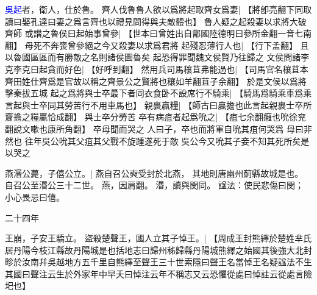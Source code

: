 \textcolor{blue}{吳起}者，衛人，仕於魯。
齊人伐魯魯人欲以爲將起取齊女爲妻|{
	【將卽亮翻下同取讀曰娶孔達曰妻之爲言齊也以禮見問得與夫敵體也】
	}
魯人疑之起殺妻以求將大破齊師
或譛之魯侯曰起始事曾參|{
	【世本曰曾姓出自鄫國陸德明曰參所金翻一音七南翻】
	}
母死不奔喪曾參絕之今又殺妻以求爲君將
起殘忍薄行人也|{
	【行下孟翻】
	}
且以魯國區區而有勝敵之名則諸侯圖魯矣
起恐得罪聞魏文侯賢乃往歸之
文侯問諸李克李克曰起貪而好色|{
	【好呼到翻】}
然用兵司馬穰苴弗能過也|{
	【司馬官名穰苴本齊田姓仕齊爲是官故以稱之齊景公之賢將也穰如羊翻苴子余翻】
	}
於是文侯以爲將擊秦拔五城
起之爲將與士卒最下者同衣食卧不設席行不騎乘|{
	【騎馬爲騎乘車爲乘言起與士卒同其勞苦行不用車馬也】}
親裹贏糧|{
	【師古曰贏擔也此言起親裹士卒所齎擔之糧贏恰成翻】}
與士卒分勞苦
卒有病疽者起爲吮之|{
	【疽七余翻癰也吮徐兖翻說文嗽也康所角翻】}
卒母聞而哭之
人曰子，卒也而將軍自吮其疽何哭爲
母曰非然也
往年吳公吮其父疽其父戰不旋踵遂死于敵
吳公今又吮其子妾不知其死所矣是以哭之

燕湣公薨，子僖公立。|{
	燕自召公奭受封於北燕，
	其地則唐幽州薊縣故城是也。
	自召公至湣公三十二世。
	燕，因肩翻。
	湣，讀與閔同。
	諡法：使民悲傷曰閔；
	小心畏忌曰僖。
	}


二十四年

王崩，子安王驕立。
盜殺楚聲王，國人立其子悼王。|{
	【周成王封熊繹於楚姓芈氏居丹陽今枝江縣故丹陽城是也括地志曰歸州秭歸縣丹陽城熊繹之始國其後強大北封畛於汝南幷吳越地方五千里自熊繹至聲王三十世索隱曰聲王名當悼王名疑諡法不生其國曰聲注云生於外家年中早夭曰悼注云年不稱志又云恐懼從處曰悼註云從處言險圯也】}
\par

